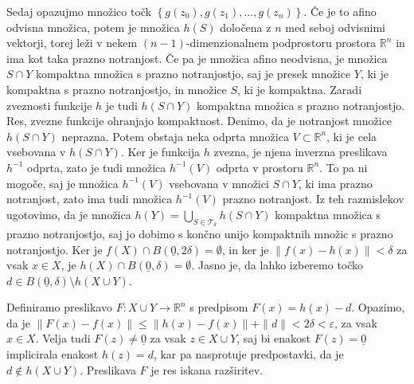 \documentclass[mat1]{fmfdelo}
\newcommand{\R}{\mathbb R}
\newcommand{\0}{\underline{0}}
\newcommand{\pT}{\mathcal T}
\begin{document}
\begin{dokaz}
Sedaj opazujmo množico točk $\left \{ g(z_0), g(z_1), \dots, g(z_n) \right \}$. Če je to afino odvisna množica, potem je množica $h(S)$ določena z $n$ med seboj odvisnimi vektorji, torej leži v nekem $(n-1)$-dimenzionalnem podprostoru prostora $\R^n$ in ima kot taka prazno notranjost. Če pa je množica afino neodvisna, je množica $S \cap Y$ kompaktna množica s prazno notranjostjo, saj je presek množice $Y$, ki je kompaktna s prazno notranjostjo, in množice $S$, ki je kompaktna. Zaradi zveznosti funkcije $h$ je tudi $h(S \cap Y)$ kompaktna množica s prazno notranjostjo. Res, zvezne funkcije ohranjajo kompaktnost. Denimo, da je notranjost množice $h(S \cap Y)$ neprazna. Potem obstaja neka odprta množica $V \subset \R^n$, ki je cela vsebovana v $h(S \cap Y)$. Ker je funkcija $h$ zvezna, je njena inverzna preslikava $h^{-1}$ odprta, zato je tudi množica $h^{-1}(V)$ odprta v prostoru $\R^n$. To pa ni mogoče, saj je množica $h^{-1}(V)$ vsebovana v množici $S \cap Y$, ki ima prazno notranjost, zato ima tudi množica $h^{-1}(V)$ prazno notranjost. Iz teh razmislekov ugotovimo, da je množica $h(Y) = \bigcup\limits_{S \in \pT_k} h(S \cap Y)$ kompaktna množica s prazno notranjostjo, saj jo dobimo s končno unijo kompaktnih množic s prazno notranjostjo. Ker je $f(X) \cap B(\0, 2 \delta) = \emptyset$, in ker je $\| f(x) - h(x) \| < \delta$ za vsak $x \in X$, je $h(X) \cap B(\0, \delta) = \emptyset$. Jasno je, da lahko izberemo točko $d \in B(\0, \delta) \setminus h(X \cup Y)$.

Definiramo preslikavo $F : X \cup Y \to \R^n$ s predpisom $F(x)  = h(x) - d$. Opazimo, da je $\| F(x) - f(x) \| \leq \| h(x) - f(x) \| + \| d \| < 2\delta < \varepsilon$, za vsak $x \in X$. Velja tudi $F(z) \neq \0$ za vsak $z \in X \cup Y$, saj bi enakost $F(z) = \0$ implicirala enakost $h(z) = d$, kar pa nasprotuje predpostavki, da je $d \notin h(X \cup Y)$. Preslikava $F$ je res iskana razširitev.
\end{dokaz}

\end{document}
